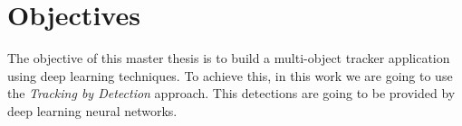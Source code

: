 \section{Objectives}
The objective of this master thesis is to build a multi-object tracker application using deep learning techniques. To achieve this, in this work we are going to use the \textit{Tracking by Detection} approach. This detections are going to be provided by deep learning neural networks.